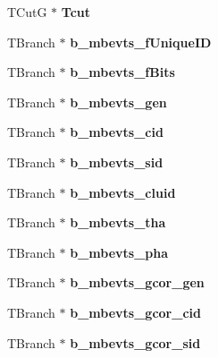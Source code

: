 \begin{DoxyCompactItemize}
T\+CutG $\ast$ {\bfseries Tcut}
\item 
\mbox{\label{classg__clx_a1f538144f99e496310a1a9ae5e70105f}} 
T\+Branch $\ast$ {\bfseries b\+\_\+mbevts\+\_\+f\+Unique\+ID}
\item 
\mbox{\label{classg__clx_a139bfd9efe94ceb8342458f5bd3e030d}} 
T\+Branch $\ast$ {\bfseries b\+\_\+mbevts\+\_\+f\+Bits}
\item 
\mbox{\label{classg__clx_ab6c9d482753c7a505ae69b37b8c70a61}} 
T\+Branch $\ast$ {\bfseries b\+\_\+mbevts\+\_\+gen}
\item 
\mbox{\label{classg__clx_ad1aa921ec8371d9fd2470cc1a9166514}} 
T\+Branch $\ast$ {\bfseries b\+\_\+mbevts\+\_\+cid}
\item 
\mbox{\label{classg__clx_a652ba89f8955d64cb10019042407ed66}} 
T\+Branch $\ast$ {\bfseries b\+\_\+mbevts\+\_\+sid}
\item 
\mbox{\label{classg__clx_ad7e1bcca259dbdcee878142a0408c4f2}} 
T\+Branch $\ast$ {\bfseries b\+\_\+mbevts\+\_\+cluid}
\item 
\mbox{\label{classg__clx_a33efe2293f5beedc00bc7ecfafa3adba}} 
T\+Branch $\ast$ {\bfseries b\+\_\+mbevts\+\_\+tha}
\item 
\mbox{\label{classg__clx_af2bd68ab618a4d407ff490d9b59f3af1}} 
T\+Branch $\ast$ {\bfseries b\+\_\+mbevts\+\_\+pha}
\item 
\mbox{\label{classg__clx_a7b323b1e8e119a1df4453be65692ee27}} 
T\+Branch $\ast$ {\bfseries b\+\_\+mbevts\+\_\+gcor\+\_\+gen}
\item 
\mbox{\label{classg__clx_ad7952e19f02fb3638597939d989a2e77}} 
T\+Branch $\ast$ {\bfseries b\+\_\+mbevts\+\_\+gcor\+\_\+cid}
\item 
\mbox{\label{classg__clx_aede01762f6b635d3047dd6f8eff7d566}} 
T\+Branch $\ast$ {\bfseries b\+\_\+mbevts\+\_\+gcor\+\_\+sid}
\item 
\mbox{\label{classg__clx_a8c1be4b1d4bf124c7a95abbeab3bde4e}} 

\end{DoxyCompactItemize}
